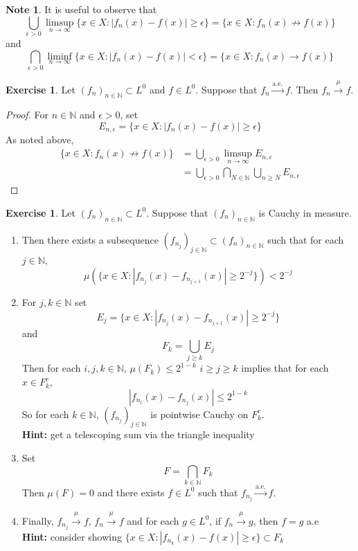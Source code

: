 \documentclass[12pt]{amsart}
\theoremstyle{definition}
\newtheorem{note}[definition]{Note}
\newtheorem{ex}[definition]{Exercise}
\newcommand{\ep}{\epsilon}
\newcommand{\N}{\mathbb{N}}
\newcommand{\convt}[1]{\xrightarrow{\text{#1}}}
\newcommand{\conv}[1]{\xrightarrow{#1}}
\newcommand{\lex}[1]{\label{ex:#1}}
\begin{document}
	\begin{note}
		It is useful to observe that 
		$$\bigcup_{\ep >0}\limsup\limits_{n \rightarrow \infty} \{x \in X: |f_n(x) - f(x)| \geq \ep \} = \{x \in X: f_n(x) \not \rightarrow f(x) \}$$ 
		and 
		$$\bigcap_{\ep > 0} \liminf_{n \rightarrow \infty}\{x \in X: |f_n(x) - f(x)| < \ep \} = \{x \in X: f_n(x) \rightarrow f(x) \}$$ 
	\end{note}
	
	\begin{ex}
	Let $(f_n)_{n \in \N} \subset L^0$ and $f \in L^0$. Suppose that $f_n \convt{a.e.} f$. Then $f_n \conv{\mu} f$. 
	\end{ex}
	
	\begin{proof}
	For $n \in \N$ and $\ep >0$, set $$E_{n, \ep} = \{x \in X: |f_n(x) - f(x)| \geq \ep\}$$
	As noted above, 
	\begin{align*}
	\{x \in X: f_n(x) \not \rightarrow f(x)\} 
	&= \bigcup_{\ep >0}\limsup\limits_{n \rightarrow \infty} E_{n, \ep} \\
	&= \bigcup_{\ep >0} \bigcap_{N \in \N} \bigcup_{n \geq N}E_{n, \ep}
	\end{align*}
	\end{proof}
	
	\begin{ex} \lex{35003} 
		Let $(f_n)_{n \in \N} \subset L^0$. Suppose that $(f_n)_{n \in \N}$ is Cauchy in measure. 
		\begin{enumerate}
		\item Then there exists a subsequence $(f_{n_j})_{j \in \N} \subset (f_n)_{n \in \N}$ such that for each $j \in \N$, $$\mu(\{x \in X: |f_{n_j}(x) - f_{n_{j+1}}(x)| \geq 2^{-j}\}) < 2^{-j}$$
		\item For $j,k \in \N$ set 
		$$E_j = \{x \in X: |f_{n_j}(x) - f_{n_{j+1}}(x)| \geq 2^{-j}\}$$
		and 
		$$F_k = \bigcup_{j \geq k}E_j$$
		Then for each $i,j, k \in \N$, $\mu(F_k) \leq 2^{1-k}$ $i \geq j \geq k$ implies that for each $x \in F_k^c$, $$|f_{n_i}(x) - f_{n_j}(x)| \leq 2^{1-k}$$ 
		So for each $k \in \N$, $(f_{n_j})_{j \in \N}$  is pointwise Cauchy on $F_k^c$. \\
		\textbf{Hint:} get a telescoping sum via the triangle inequality 
		\item Set $$F = \bigcap_{k \in \N} F_k$$ 
		Then $\mu(F) = 0$ and there exists $f \in L^0$ such that $f_{n_j} \convt{a.e.} f$.  
		\item Finally, $f_{n_j} \conv{\mu} f$, $f_n \conv{\mu} f$ and for each $g \in L^0$, if $f_n \conv{\mu} g$, then $f = g$ a.e \\
		\textbf{Hint:} consider showing $\{x \in X: |f_{n_k}(x) - f(x)| \geq \ep\} \subset F_k$ 
		\end{enumerate}  
	\end{ex}
	
\end{document}
